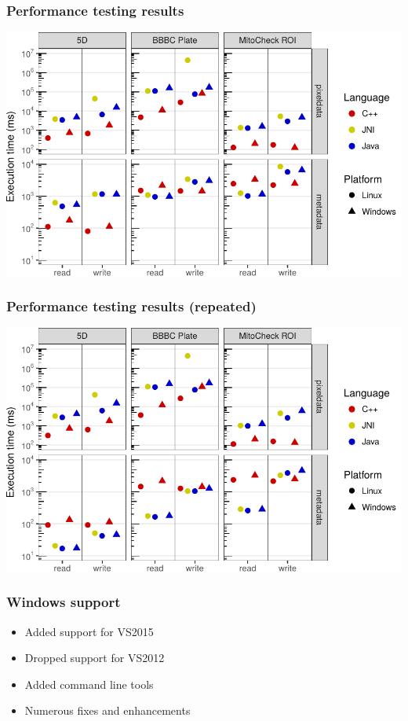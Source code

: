 \documentclass{beamer}
\begin{document}
\begin{frame}[fragile]
  \frametitle{Performance testing results}
  \begin{centering}
    \includegraphics[width=\textwidth]{figures/files-suppfig5}
  \end{centering}
\end{frame}

\begin{frame}[fragile]
  \frametitle{Performance testing results (repeated)}
  \begin{centering}
    \includegraphics[width=\textwidth]{figures/files-suppfig6}
  \end{centering}
\end{frame}

\begin{frame}[fragile]
  \frametitle{Windows support}

  \begin{itemize}
  \item Added support for VS2015
  \item Dropped support for VS2012
  \item Added command line tools
  \item Numerous fixes and enhancements
  \end{itemize}
\end{frame}
\end{document}
